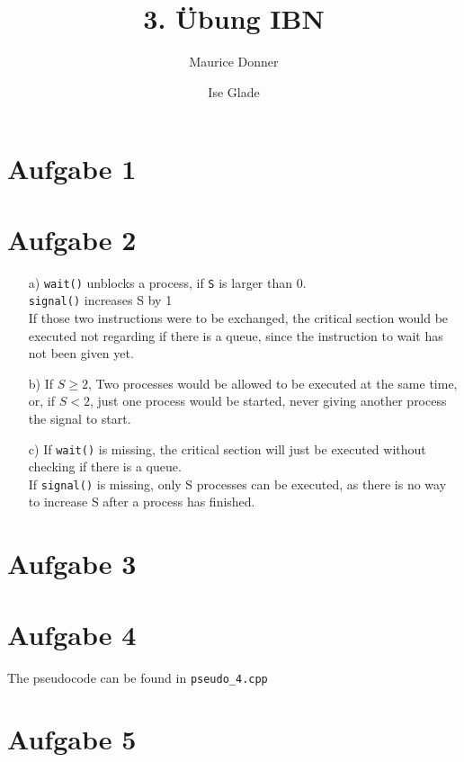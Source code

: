 \documentclass{article}
\title{\textsf{\color{blue!40!black}3. Übung IBN}}
\author{Maurice Donner \and Ise Glade}
\begin{document}
\maketitle
\newpage

\section*{Aufgabe 1}
\section*{Aufgabe 2}
\begin{itemize}
    \item[a)] 
	\verb=wait()= unblocks a process, if \verb=S= is larger than 0.\\
	\verb=signal()= increases S by 1\\
	If those two instructions were to be exchanged, the critical section
	would be executed not regarding if there is a queue, since
	the instruction to wait has not been given yet.
    \item[b)]
	If \( S \geq 2 \), Two processes would be allowed to be executed
	at the same time, or, if \( S < 2 \), just one process would
	be started, never giving another process the signal to start.
    \item[c)]
	If \verb=wait()= is missing, the critical section will just be executed
	without checking if there is a queue.\\
	If \verb=signal()= is missing, only S processes can be executed, as
	there is no way to increase S after a process has finished.
\end{itemize}
\section*{Aufgabe 3}
\section*{Aufgabe 4}
The pseudocode can be found in \texttt{pseudo\_4.cpp}
\section*{Aufgabe 5}
\end{document}

